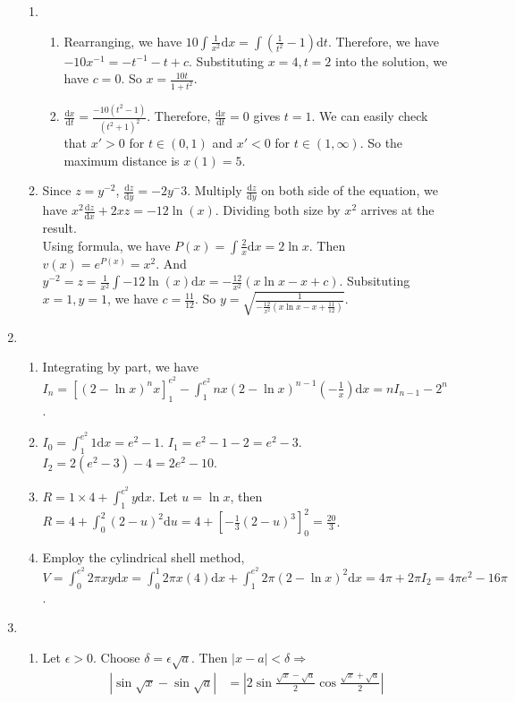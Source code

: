 \documentclass[12pt]{article}
\newcommand{\diff}{\mathrm{d}}
\theoremstyle{definition}
\begin{document}
\begin{enumerate}
\begin{enumerate}
    \item\begin{enumerate}
      \item Rearranging, we have $10\int\frac{1}{x^2}\diff x = \int (\frac{1}{t^2}-1)\diff t$. Therefore, we have $-10x^{-1}=-t^{-1}-t+c$. Substituting $x=4, t=2$ into the solution, we have $c=0$. So $x=\frac{10t}{1+t^2}$.
      \item $\frac{\diff x}{\diff t}=\frac{-10(t^2-1)}{(t^2+1)^2}$. Therefore, $\frac{\diff x}{\diff t}=0$ gives $t=1$. We can easily check that $x'>0$ for $t\in(0,1)$ and $x'<0$ for $t\in(1,\infty)$. So the maximum distance is $x(1)=5$.
    \end{enumerate}
    \item Since $z=y^{-2}$, $\frac{\diff z}{\diff y}=-2y^-3$. Multiply $\frac{\diff z}{\diff y}$ on both side of the equation, we have $x^2\frac{\diff z}{\diff x}+2xz = -12\ln(x)$. Dividing both size by $x^2$ arrives at the result.\\
    Using formula, we have $P(x)=\int \frac{2}{x}\diff x = 2\ln x$. Then $v(x)=e^{P(x)}=x^2$. And $y^{-2}=z=\frac{1}{x^2}\int -12\ln(x)\diff x=-\frac{12}{x^2}(x\ln x - x + c)$. Subsituting $x=1, y=1$, we have $c=\frac{11}{12}$. So $y=\sqrt{\frac{1}{-\frac{12}{x^2}(x\ln x - x + \frac{11}{12})}}$.
  \end{enumerate}
  \item\begin{enumerate}
    \item Integrating by part, we have $I_n = [(2-\ln x)^nx]_1^{e^2}-\int_1^{e^2} nx(2-\ln x)^{n-1}(-\frac{1}{x})\diff x = nI_{n-1}-2^n$.
    \item $I_0 = \int_1^{e^2} 1\diff x = e^2-1$. $I_1 = e^2-1-2 = e^2-3$. $I_2 = 2(e^2-3)-4 = 2e^2-10$.
    \item $R=1\times 4 + \int_1^{e^2}y\diff x$. Let $u=\ln x$, then $R=4+\int_0^2 (2-u)^2\diff u =4+[-\frac{1}{3}(2-u)^3]_0^2 = \frac{20}{3}$. 
    \item Employ the cylindrical shell method, $V=\int_0^{e^2}2\pi xy\diff x = \int_0^1 2\pi x(4)\diff x + \int_1^{e^2} 2\pi (2-\ln x)^2\diff x = 4\pi + 2\pi I_2 = 4\pi e^2-16\pi$.
  \end{enumerate}
  \item\begin{enumerate}
    \item Let $\epsilon>0$. Choose $\delta = \epsilon\sqrt{a}$. Then $|x-a|<\delta \Rightarrow$
    \begin{align*}
    |\sin\sqrt{x}-\sin\sqrt{a}|&=|2\sin\frac{\sqrt{x}-\sqrt{a}}{2}\cos\frac{\sqrt{x}+\sqrt{a}}{2}|\\

\end{align*}
\end{enumerate}
\end{enumerate}
\end{document}
